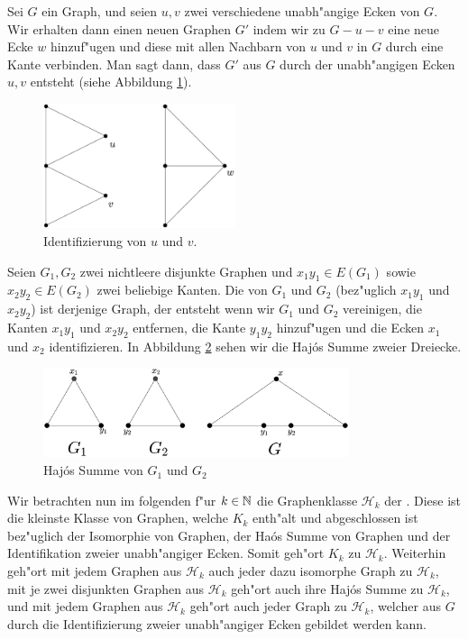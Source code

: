 Sei $G$ ein Graph, und seien $u,v$ zwei verschiedene unabh"angige Ecken von $G$. Wir erhalten dann einen neuen Graphen $G'$ indem wir zu $G-u-v$ eine neue Ecke $w$ hinzuf"ugen und diese mit allen Nachbarn von $u$ und $v$ in $G$ durch eine Kante verbinden.
Man sagt dann, dass $G'$ aus $G$ durch  der unabh"angigen Ecken $u,v$ entsteht (siehe Abbildung \ref{fig:identifizierung}).
\begin{figure}[h]
  \centering
  \includegraphics[width=0.5\textwidth]{images/Identifizierung}
  \caption{Identifizierung von $u$ und $v$.}
  \label{fig:identifizierung}
\end{figure}

Seien $G_1, G_2$ zwei nichtleere disjunkte Graphen und $x_1y_1\in E(G_1)$ sowie $x_2y_2 \in E(G_2)$ zwei beliebige Kanten. Die  von $G_1$ und $G_2$ (bez"uglich $x_1y_1$ und $x_2y_2$) ist derjenige Graph, der entsteht wenn wir $G_1$ und $G_2$ vereinigen, die Kanten $x_1y_1$ und $x_2y_2$ entfernen, die Kante $y_1y_2$ hinzuf"ugen und  die Ecken $x_1$ und $x_2$ identifizieren. 
In Abbildung \ref{fig:HajosSumme} sehen wir die Haj\'os Summe zweier Dreiecke.

\begin{figure}[h]
  \centering
  \includegraphics[width=0.8\textwidth]{images/HajosSumme}
  \caption{Haj\'os Summe von $G_1$ und $G_2$}
  \label{fig:HajosSumme}
\end{figure}
Wir betrachten nun im folgenden f"ur $k\in {\mathbb{N}}$ die Graphenklasse $\mathcal{H}_k$ der . Diese ist die kleinste Klasse von Graphen, welche $K_k$ enth"alt und abgeschlossen ist bez"uglich der Isomorphie von Graphen, der Ha\'os Summe von Graphen und der Identifikation zweier unabh"angiger Ecken. Somit geh"ort $K_k$ zu $\mathcal{H}_k$. Weiterhin geh"ort mit jedem Graphen aus $\mathcal{H}_k$ auch jeder dazu isomorphe Graph zu $\mathcal{H}_k$,
mit je zwei disjunkten Graphen aus $\mathcal{H}_k$ geh"ort auch ihre Haj\'os Summe zu $\mathcal{H}_k$, und mit jedem Graphen aus $\mathcal{H}_k$ geh"ort auch jeder Graph zu $\mathcal{H}_k$, welcher aus $G$ durch die Identifizierung zweier unabh"angiger Ecken gebildet werden kann. 

